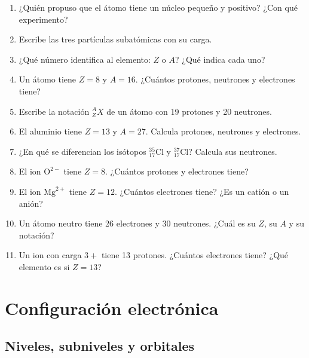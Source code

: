 \documentclass[12pt, letterpaper]{article}
\begin{document}
\begin{enumerate}[leftmargin=*, resume]
  \item \facil{} ¿Quién propuso que el átomo tiene un núcleo pequeño y positivo? ¿Con qué experimento?

  \item \facil{} Escribe las tres partículas subatómicas con su carga.

  \item \facil{} ¿Qué número identifica al elemento: $Z$ o $A$? ¿Qué indica cada uno?

  \item \facil{} Un átomo tiene $Z = 8$ y $A = 16$. ¿Cuántos protones, neutrones y electrones tiene?

  \item \facil{} Escribe la notación ${}^{A}_{Z}X$ de un átomo con 19 protones y 20 neutrones.

  \item \medio{} El aluminio tiene $Z = 13$ y $A = 27$. Calcula protones, neutrones y electrones.

  \item \medio{} ¿En qué se diferencian los isótopos ${}^{35}_{17}\text{Cl}$ y ${}^{37}_{17}\text{Cl}$? Calcula sus neutrones.

  \item \medio{} El ion $\text{O}^{2-}$ tiene $Z = 8$. ¿Cuántos protones y electrones tiene?

  \item \medio{} El ion $\text{Mg}^{2+}$ tiene $Z = 12$. ¿Cuántos electrones tiene? ¿Es un catión o un anión?

  \item \dificil{} Un átomo neutro tiene 26 electrones y 30 neutrones. ¿Cuál es su $Z$, su $A$ y su notación?

  \item \dificil{} Un ion con carga $3+$ tiene 13 protones. ¿Cuántos electrones tiene? ¿Qué elemento es si $Z = 13$?
\end{enumerate}

\section{Configuración electrónica}

\subsection{Niveles, subniveles y orbitales}
\end{document}
